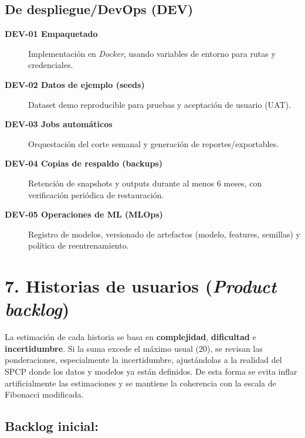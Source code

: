 \documentclass[12pt]
{charter}
\begin{document}
\subsection{De despliegue/DevOps (DEV)}
\begin{description}
  \item[\textbf{DEV-01 Empaquetado}] Implementación en \textit{Docker}, usando variables de entorno para rutas y credenciales.

  \item[\textbf{DEV-02 Datos de ejemplo (seeds)}] Dataset demo reproducible para pruebas y aceptación de usuario (UAT).
  
  \item[\textbf{DEV-03 Jobs automáticos}] Orquestación del corte semanal y generación de reportes/exportables.
  
  \item[\textbf{DEV-04 Copias de respaldo (backups)}] Retención de snapshots y outputs durante al menos 6 meses, con verificación periódica de restauración.
  
  \item[\textbf{DEV-05 Operaciones de ML (MLOps)}] Registro de modelos, versionado de artefactos (modelo, features, semillas) y política de reentrenamiento.

\end{description}


\section{7. Historias de usuarios (\textit{Product backlog})}
\label{sec:backlog}

La estimación de cada historia se basa en \textbf{complejidad}, \textbf{dificultad} e \textbf{incertidumbre}.
Si la suma excede el máximo usual (20), se revisan las ponderaciones, especialmente la incertidumbre, ajustándolas a la realidad del SPCP donde los datos y modelos ya están definidos.
De esta forma se evita inflar artificialmente las estimaciones y se mantiene la coherencia con la escala de Fibonacci modificada.

\subsection*{Backlog inicial:}
\end{document}
